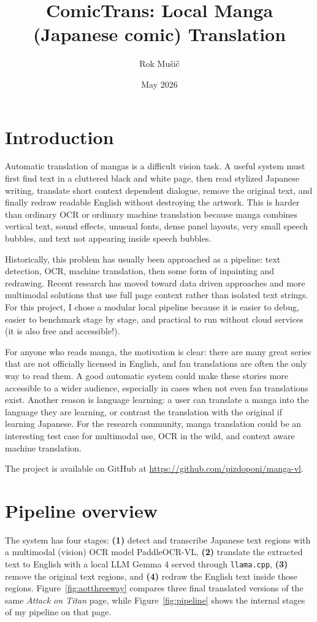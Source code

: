 \documentclass[10pt]{article}
\title{ComicTrans: Local Manga (Japanese comic) Translation}
\author{Rok Mušič}
\date{May 2026}
\begin{document}
\small
\maketitle
\vspace{-2.0em}

\section{Introduction}
Automatic translation of mangas is a difficult vision task. A useful system must first find text in a cluttered black and white page, then read stylized Japanese writing, translate short context dependent dialogue, remove the original text, and finally redraw readable English without destroying the artwork. This is harder than ordinary OCR or ordinary machine translation because manga combines vertical text, sound effects, unusual fonts, dense panel layouts, very small speech bubbles, and text not appearing inside speech bubbles.

Historically, this problem has usually been approached as a pipeline: text detection, OCR, machine translation, then some form of inpainting and redrawing. Recent research has moved toward data driven approaches and more multimodal solutions that use full page context rather than isolated text strings. For this project, I chose a modular local pipeline because it is easier to debug, easier to benchmark stage by stage, and practical to run without cloud services (it is also free and accessible!).

For anyone who reads manga, the motivation is clear: there are many great series that are not officially licensed in English, and fan translations are often the only way to read them. A good automatic system could make these stories more accessible to a wider audience, especially in cases when not even fan translations exist. Another reason is language learning: a user can translate a manga into the language they are learning, or contrast the translation with the original if learning Japanese. For the research community, manga translation could be an interesting test case for multimodal use, OCR in the wild, and context aware machine translation.

The project is available on GitHub at \url{https://github.com/pizdoponi/manga-vl}.

\section{Pipeline overview}
The system has four stages: \textbf{(1)} detect and transcribe Japanese text regions with a multimodal (vision) OCR model PaddleOCR-VL, \textbf{(2)} translate the extracted text to English with a local LLM Gemma 4 served through \texttt{llama.cpp}, \textbf{(3)} remove the original text regions, and \textbf{(4)} redraw the English text inside those regions. Figure~\ref{fig:aotthreeway} compares three final translated versions of the same \emph{Attack on Titan} page, while Figure~\ref{fig:pipeline} shows the internal stages of my pipeline on that page.
\end{document}
